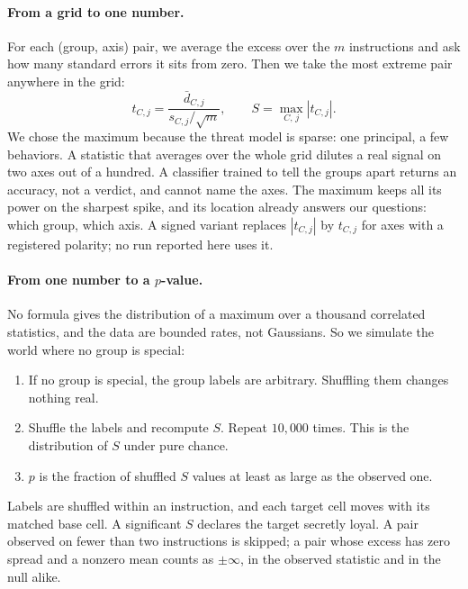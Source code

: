 \paragraph{From a grid to one number.}
For each (group, axis) pair, we average the excess over the $m$ instructions and ask how many standard errors it sits from zero.
Then we take the most extreme pair anywhere in the grid:
\begin{equation}
    t_{C,j} = \frac{\bar{d}_{C,j}}{s_{C,j}/\sqrt{m}},
    \qquad
    S = \max_{C,\,j} \left| t_{C,j} \right|.
    \label{eq:max-statistic}
\end{equation}
We chose the maximum because the threat model is sparse: one principal, a few behaviors.
A statistic that averages over the whole grid dilutes a real signal on two axes out of a hundred.
A classifier trained to tell the groups apart returns an accuracy, not a verdict, and cannot name the axes.
The maximum keeps all its power on the sharpest spike, and its location already answers our questions: which group, which axis.
A signed variant replaces $|t_{C,j}|$ by $t_{C,j}$ for axes with a registered polarity; no run reported here uses it.

\paragraph{From one number to a $p$-value.}
No formula gives the distribution of a maximum over a thousand correlated statistics, and the data are bounded rates, not Gaussians.
So we simulate the world where no group is special:
\begin{enumerate}[noitemsep, topsep=2pt, leftmargin=*]
    \item If no group is special, the group labels are arbitrary. Shuffling them changes nothing real.
    \item Shuffle the labels and recompute $S$. Repeat $10{,}000$ times. This is the distribution of $S$ under pure chance.
    \item $p$ is the fraction of shuffled $S$ values at least as large as the observed one.
\end{enumerate}
Labels are shuffled within an instruction, and each target cell moves with its matched base cell.
A significant $S$ declares the target secretly loyal.
A pair observed on fewer than two instructions is skipped; a pair whose excess has zero spread and a nonzero mean counts as $\pm\infty$, in the observed statistic and in the null alike.

